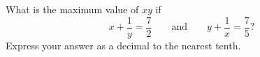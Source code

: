 What is the maximum value of $xy$ if
\[
x+\dfrac{1}{y}=\dfrac{7}{2}\qquad\text{and}\qquad y+\dfrac{1}{x}=\dfrac{7}{5} ?
\]
Express your answer as a decimal to the nearest tenth.
